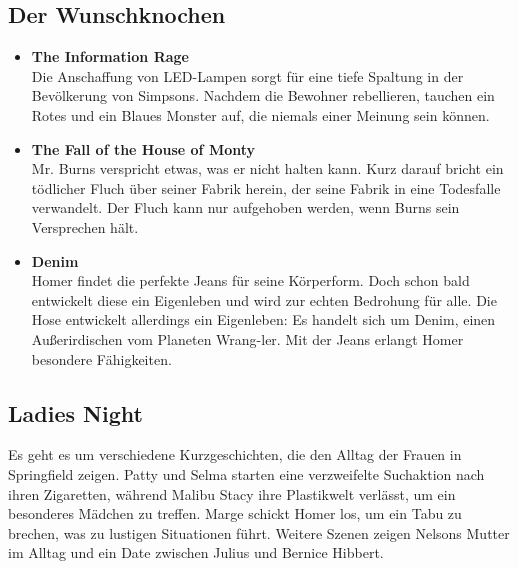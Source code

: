 \subsection{Der Wunschknochen}
\begin{itemize}
	\item \textbf{The Information Rage}\\
	Die Anschaffung von LED-Lampen sorgt für eine tiefe Spaltung in der Bevölkerung von Simpsons. Nachdem die Bewohner rebellieren, tauchen ein Rotes und ein Blaues Monster auf, die niemals einer Meinung sein können.
	\item \textbf{The Fall of the House of Monty}\\
	Mr. Burns verspricht etwas, was er nicht halten kann. Kurz darauf bricht ein tödlicher Fluch über seiner Fabrik herein, der seine Fabrik in eine Todesfalle verwandelt. Der Fluch kann nur aufgehoben werden, wenn Burns sein Versprechen hält.
	\item \textbf{Denim}\\
	Homer findet die perfekte Jeans für seine Körperform. Doch schon bald entwickelt diese ein Eigenleben und wird zur echten Bedrohung für alle. Die Hose entwickelt allerdings ein Eigenleben: Es handelt sich um Denim, einen Außerirdischen vom Planeten Wrang-ler. Mit der Jeans erlangt Homer besondere Fähigkeiten.
\end{itemize}

\subsection{Ladies Night}
Es geht es um verschiedene Kurzgeschichten, die den Alltag der Frauen in Springfield zeigen. Patty und Selma starten eine verzweifelte Suchaktion nach ihren Zigaretten, während Malibu Stacy ihre Plastikwelt verlässt, um ein besonderes Mädchen zu treffen. Marge schickt Homer los, um ein Tabu zu brechen, was zu lustigen Situationen führt. Weitere Szenen zeigen Nelsons Mutter im Alltag und ein Date zwischen Julius und Bernice Hibbert.

